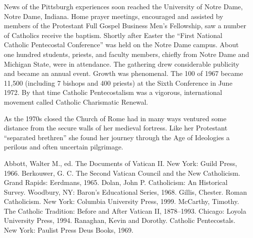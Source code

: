 News of the Pittsburgh experiences soon reached the University of Notre Dame, Notre Dame, Indiana.
Home prayer meetings, encouraged and assisted by members of the Protestant Full Gospel Business
Men’s Fellowship, saw a number of Catholics receive the baptism. Shortly after Easter the “First
National Catholic Pentecostal Conference” was held on the Notre Dame campus. About one hundred
students, priests, and faculty members, chiefly from Notre Dame and Michigan State, were in
attendance. The gathering drew considerable publicity and became an annual event. Growth was
phenomenal. The 100 of 1967 became 11,500 (including 7 bishops and 400 priests) at the Sixth
Conference in June 1972. By that time Catholic Pentecostalism was a vigorous, international movement
called Catholic Charismatic Renewal.

As the 1970s closed the Church of Rome had in many ways ventured some distance from the secure walls
of her medieval fortress. Like her Protestant “separated brethren” she found her journey through the
Age of Ideologies a perilous and often uncertain pilgrimage.

\begin{readinglist}
\entry Abbott, Walter M., ed. The Documents of Vatican II. New York: Guild Press, 1966.
\entry Berkouwer, G. C. The Second Vatican Council and the New Catholicism. Grand Rapids: Eerdmans,
  1965.
\entry Dolan, John P. Catholicism: An Historical Survey. Woodbury, NY: Baron’s Educational Series,
  1968.
\entry Gillis, Chester. Roman Catholicism. New York: Columbia University Press, 1999.
\entry McCarthy, Timothy. The Catholic Tradition: Before and After Vatican II, 1878–1993. Chicago:
  Loyola University Press, 1994.
\entry Ranaghan, Kevin and Dorothy. Catholic Pentecostals. New York: Paulist Press Deus Books, 1969.
\end{readinglist}

